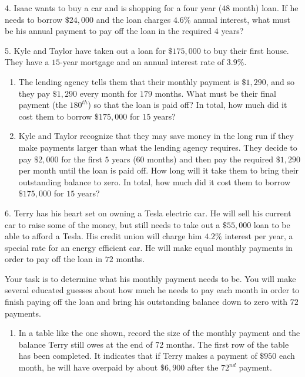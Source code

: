 \documentclass[10pt,]{book}
\theoremstyle{plain}
\theoremstyle{definition}
\theoremstyle{definition}
\theoremstyle{definition}
\numberwithin{equation}{section}
\begin{document}
\begin{exerciselist}
\par\smallskip
\item[4.]\hypertarget{exercise-15}{}Isaac wants to buy a car and is shopping for a four year (\(48\) month) loan. If he needs to borrow \(\$24,000\) and the loan charges \(4.6\%\) annual interest, what must be his annual payment to pay off the loan in the required \(4\) years?%
\par\smallskip
\item[5.]\hypertarget{exercise-16}{}Kyle and Taylor have taken out a loan for \(\$175,000\) to buy their first house. They have a \(15\)-year mortgage and an annual interest rate of \(3.9\%\). \leavevmode%
\begin{enumerate}[label=(\alph*)]
\item\hypertarget{li-52}{}The lending agency tells them that their monthly payment is \(\$1,290\), and so they pay \(\$1,290\) every month for \(179\) months. What must be their final payment (the \(180^{th}\)) so that the loan is paid off?  In total, how much did it cost them to borrow \(\$175,000\) for \(15\) years?%
\item\hypertarget{li-53}{}Kyle and Taylor recognize that they may save money in the long run if they make payments larger than what the lending agency requires. They decide to pay \(\$2,000\) for the first \(5\) years (\(60\) months) and then pay the required \(\$1,290\) per month until the loan is paid off. How long will it take them to bring their outstanding balance to zero. In total, how much did it cost them to borrow \(\$175,000\) for \(15\) years?%
\end{enumerate}
%
\par\smallskip
\item[6.]\hypertarget{exercise-17}{}Terry has his heart set on owning a Tesla electric car. He will sell his current car to raise some of the money, but still needs to take out a \(\$55,000\) loan to be able to afford a Tesla. His credit union will charge him \(4.2\%\) interest per year, a special rate for an energy efficient car. He will make equal monthly payments in order to pay off the loan in \(72\) months.%
\par
Your task is to determine what his monthly payment needs to be. You will make several educated guesses about how much he needs to pay each month in order to finish paying off the loan and bring his outstanding balance down to zero with \(72\) payments. \leavevmode%
\begin{enumerate}[label=(\alph*)]
\item\hypertarget{li-54}{}In a table like the one shown, record the size of the monthly payment and the balance Terry still owes at the end of 72 months. The first row of the table has been completed. It indicates that if Terry makes a payment of \(\$950\) each month, he will have overpaid by about \(\$6,900\) after the \(72^{nd}\) payment. \begin{table}

\end{table}
\end{enumerate}
\end{exerciselist}
\end{document}
